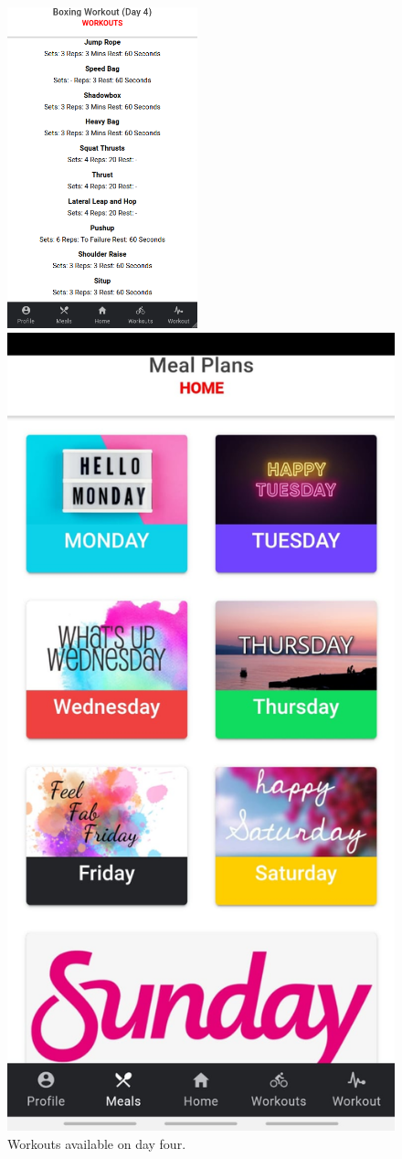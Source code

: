 \documentclass[a4paper,12pt]{report}
\begin{document}
\begin{figure}[ht] 
  \label{ fig7} 
  \begin{minipage}[b]{0.5\linewidth}
    \centering
    \includegraphics[width=5.5cm, height=10.5cm\linewidth]{images/aplicationImages/workouts.png} 
    \caption{Workouts available on day four.} 
    \vspace{4ex}
  \end{minipage}%
  \begin{minipage}[b]{0.5\linewidth}
    \centering
    \includegraphics[width=.7\linewidth]{images/aplicationImages/mealsTop.jpeg} 

\end{minipage}
\end{figure}
\end{document}
